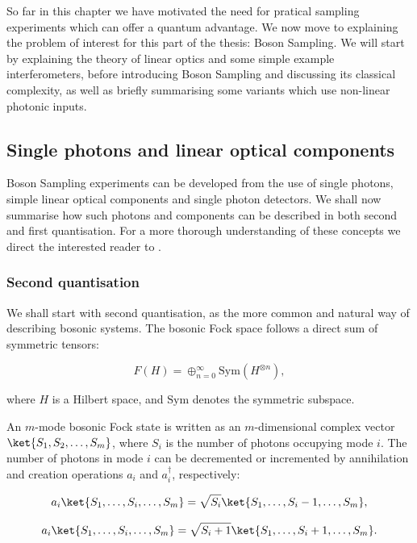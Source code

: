 So far in this chapter we have motivated the need for pratical sampling experiments which can offer a quantum advantage. We now move to explaining the problem of interest for this part of the thesis: Boson Sampling. We will start by explaining the theory of linear optics and some simple example interferometers, before introducing Boson Sampling and discussing its classical complexity, as well as briefly summarising some variants which use non-linear photonic inputs.

\subsection{Single photons and linear optical components}

Boson Sampling experiments can be developed from the use of single photons, simple linear optical components and single photon detectors. We shall now summarise how such photons and components can be described in both second and first quantisation. For a more thorough understanding of these concepts we direct the interested reader to \cite{fox2006, gerry2012}.

\subsubsection{Second quantisation}

We shall start with second quantisation, as the more common and natural way of describing bosonic systems. The bosonic Fock space follows a direct sum of symmetric tensors:

\begin{equation}
F(H) = \oplus_{n=0}^\infty\textrm{Sym}(H^{\otimes n}),
\end{equation}

\noindent where $H$ is a Hilbert space, and $\textrm{Sym}$ denotes the symmetric subspace.

An $m$-mode bosonic Fock state is written as an $m$-dimensional complex vector $\ket{S_1,S_2,\dots,S_m}$, where $S_i$ is the number of photons occupying mode $i$. The number of photons in mode $i$ can be decremented or incremented by annihilation and creation operations $a_i$ and $a_i^\dagger$, respectively:

\begin{equation}
a_i\ket{S_1,\dots,S_i,\dots,S_m} = \sqrt{S_i}\ket{S_1,\dots,S_i-1,\dots,S_m},
\end{equation}

\begin{equation}
a_i\ket{S_1,\dots,S_i,\dots,S_m} = \sqrt{S_i+1}\ket{S_1,\dots,S_i+1,\dots,S_m}.
\end{equation}

